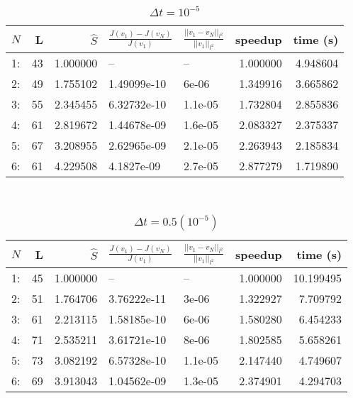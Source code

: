 \begin{table}[h]
\centering
\caption{$\Delta t = 10^{-5}$}
\label{actual_speedup_1}
\begin{tabular}{lrrllrr}
\toprule
{} $N$&   L &        $\hat S$ &          $\frac{J(v_1)-J(v_N)}{J(v_1)}$ &    $\frac{||v_1-v_N||_{l^2}}{||v_1||_{l^2}}$&   speedup &      time (s)\\
\midrule
1: &  43 &  1.000000 &           -- &       -- &  1.000000 &  4.948604 \\
2: &  49 &  1.755102 &  1.49099e-10 &    6e-06 &  1.349916 &  3.665862 \\
3: &  55 &  2.345455 &  6.32732e-10 &  1.1e-05 &  1.732804 &  2.855836 \\
4: &  61 &  2.819672 &  1.44678e-09 &  1.6e-05 &  2.083327 &  2.375337 \\
5: &  67 &  3.208955 &  2.62965e-09 &  2.1e-05 &  2.263943 &  2.185834 \\
6: &  61 &  4.229508 &   4.1827e-09 &  2.7e-05 &  2.877279 &  1.719890 \\
\bottomrule
\end{tabular}
\end{table}
\\
\begin{table}[h]
\centering
\caption{$\Delta t = 0.5(10^{-5})$}
\label{actual_speedup_2}
\begin{tabular}{lrrllrr}
\toprule
{} $N$&   L &        $\hat S$ &         $\frac{J(v_1)-J(v_N)}{J(v_1)}$ &    $\frac{||v_1-v_N||_{l^2}}{||v_1||_{l^2}}$&speedup &       time (s) \\
\midrule
1: &  45 &  1.000000 &           -- &       -- &  1.000000 &  10.199495 \\
2: &  51 &  1.764706 &  3.76222e-11 &    3e-06 &  1.322927 &   7.709792 \\
3: &  61 &  2.213115 &  1.58185e-10 &    6e-06 &  1.580280 &   6.454233 \\
4: &  71 &  2.535211 &  3.61721e-10 &    8e-06 &  1.802585 &   5.658261 \\
5: &  73 &  3.082192 &  6.57328e-10 &  1.1e-05 &  2.147440 &   4.749607 \\
6: &  69 &  3.913043 &  1.04562e-09 &  1.3e-05 &  2.374901 &   4.294703 \\
\bottomrule
\end{tabular}
\end{table}
\\
